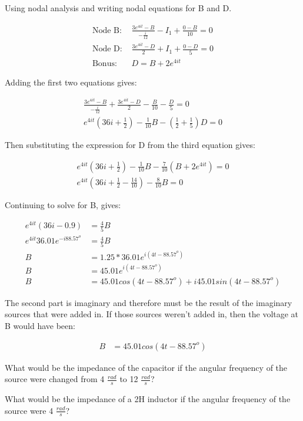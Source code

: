 Using nodal analysis and writing nodal equations for B and D.

\begin{align*}
\text{Node B: }&\frac{3e^{4it}-B}{-\frac{i}{12}}-I_1+\frac{0-B}{10}=0\\
\text{Node D: }&\frac{3e^{4it}-D}{2}+I_1+\frac{0-D}{5}=0\\
\text{Bonus: }&D=B+2e^{4it}
\end{align*}

Adding the first two equations gives:

\begin{align*}
\frac{3e^{4it}-B}{-\frac{i}{12}}+\frac{3e^{4it}-D}{2}-\frac{B}{10}-\frac{D}{5}=0\\
e^{4it}(36i+\frac{1}{2})-\frac{1}{10}B-(\frac{1}{2}+\frac{1}{5})D=0
\end{align*}

Then substituting the expression for D from the third equation gives:

\begin{align*}
e^{4it}(36i+\frac{1}{2})-\frac{1}{10}B-\frac{7}{10}(B+2e^{4it})=0\\
e^{4it}(36i+\frac{1}{2}-\frac{14}{10})-\frac{8}{10}B=0
\end{align*}

Continuing to solve for B, gives:

\begin{align*}
e^{4it}(36i-0.9)&=\frac{4}{5}B\\
e^{4it}36.01e^{-i88.57^o}&=\frac{4}{5}B\\
B&=1.25*36.01e^{i(4t-88.57^o)}\\
B&=45.01e^{i(4t-88.57^o)}\\
B&=45.01cos(4t-88.57^o)+i45.01sin(4t-88.57^o)
\end{align*}

The second part is imaginary and therefore must be the result of the imaginary sources that were added in. If those sources weren't added in, then the voltage at B would have been: 

\begin{align}
B&=45.01cos(4t-88.57^o)
\end{align}

\begin{alevel}
What would be the impedance of the capacitor if the angular frequency of the source were changed from 4 $\frac{rad}{s}$ to 12 $\frac{rad}{s}$?
\end{alevel}

\begin{alevel}
What would be the impedance of a 2H inductor if the angular frequency of the source were 4 $\frac{rad}{s}$?
\end{alevel}


